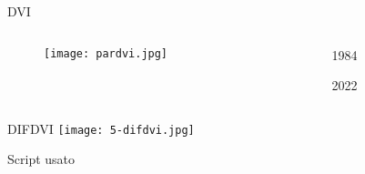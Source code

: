 \documentclass{beamer}
\begin{document}
\begin{frame}{DVI}
    \begin{columns}
    \begin{column}{0.6\textwidth}
    \begin{figure}
        \centering
        \texttt{[image: pardvi.jpg]}
    \end{figure}
    \end{column}
    \begin{column}{0.1\textwidth}
     1984 
     
     \bigskip
     
     \bigskip
     
     \bigskip
     
     \bigskip
     
     \bigskip
     
     \bigskip
     
     \bigskip
     
     \bigskip
     
     \bigskip
     
     \bigskip
     
     2022
    \end{column}
    \end{columns}
\end{frame}

\begin{frame}{DIFDVI}
    \texttt{[image: 5-difdvi.jpg]}
    \centering
\end{frame}

\begin{frame}{Script usato}
    \begin{scriptsize}
        
    \end{scriptsize}
\end{frame}
\end{document}
